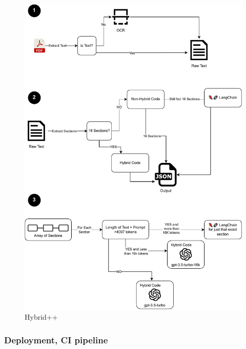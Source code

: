 \documentclass[a4paper,12pt,twoside]{report}
\begin{document}
\begin{figure}
		\includegraphics[width=\textwidth, keepaspectratio ]{images/bigCode}
	\caption[Improvements on Hybrid code]{Hybrid++}
\label{Hybrid++}
\end{figure}
\subsubsection{Deployment, CI pipeline}
\end{document}
